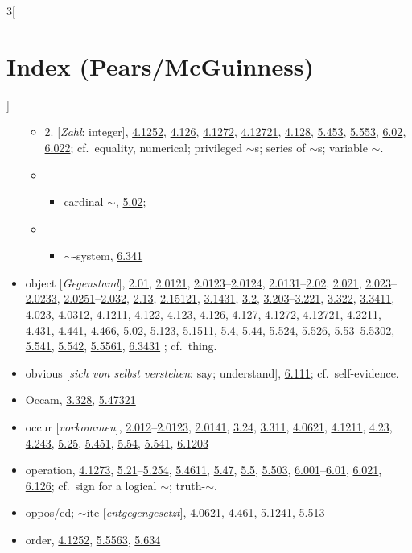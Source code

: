 \documentclass[oneside,openany,12pt]{book}
\newcommand{\indexentry}[1]{\item #1}
\newcommand{\indexsubentry}[1]{\begin{itemize} \item #1 \end{itemize}}
\newcommand{\indexsubsubentry}[1]{\begin{itemize} \item \begin{itemize} \item #1 \end{itemize} \end{itemize}}
\newcommand{\indexref}[1]{\hyperlink{prop#1}{#1}}
\newcommand{\indexgap}{\bigskip}
\begin{document}
\begin{multicols}{3}[\section*{Index (Pears/McGuinness)}]
\begin{itemize}
   \indexsubentry{2. [\textit{Zahl}: integer], \indexref{4.1252}, \indexref{4.126}, \indexref{4.1272}, \indexref{4.12721}, \indexref{4.128}, \indexref{5.453}, \indexref{5.553}, \indexref{6.02}, \indexref{6.022}; cf.\ equality, numerical; privileged $\sim$s; series of $\sim$s; variable $\sim$.}

   \indexsubsubentry{cardinal $\sim$, \indexref{5.02};}

   \indexsubsubentry{$\sim$-system, \indexref{6.341}}

\indexgap

\indexentry{object [\textit{Gegenstand}], \indexref{2.01}, \indexref{2.0121}, \indexref{2.0123}--\indexref{2.0124}, \indexref{2.0131}--\indexref{2.02}, \indexref{2.021}, \indexref{2.023}--\indexref{2.0233}, \indexref{2.0251}--\indexref{2.032}, \indexref{2.13}, \indexref{2.15121}, \indexref{3.1431}, \indexref{3.2}, \indexref{3.203}--\indexref{3.221}, \indexref{3.322}, \indexref{3.3411}, \indexref{4.023}, \indexref{4.0312}, \indexref{4.1211}, \indexref{4.122}, \indexref{4.123}, \indexref{4.126}, \indexref{4.127}, \indexref{4.1272}, \indexref{4.12721}, \indexref{4.2211}, \indexref{4.431}, \indexref{4.441}, \indexref{4.466}, \indexref{5.02}, \indexref{5.123}, \indexref{5.1511}, \indexref{5.4}, \indexref{5.44}, \indexref{5.524}, \indexref{5.526}, \indexref{5.53}--\indexref{5.5302}, \indexref{5.541}, \indexref{5.542}, \indexref{5.5561}, \indexref{6.3431} ; cf.\ thing.}

\indexentry{obvious [\textit{sich von selbst verstehen}: say; understand], \indexref{6.111}; cf.\ self-evidence.}

\indexentry{Occam, \indexref{3.328}, \indexref{5.47321}}

\indexentry{occur [\textit{vorkommen}], \indexref{2.012}--\indexref{2.0123}, \indexref{2.0141}, \indexref{3.24}, \indexref{3.311}, \indexref{4.0621}, \indexref{4.1211}, \indexref{4.23}, \indexref{4.243}, \indexref{5.25}, \indexref{5.451}, \indexref{5.54}, \indexref{5.541}, \indexref{6.1203}}

\indexentry{operation, \indexref{4.1273}, \indexref{5.21}--\indexref{5.254}, \indexref{5.4611}, \indexref{5.47}, \indexref{5.5}, \indexref{5.503}, \indexref{6.001}--\indexref{6.01}, \indexref{6.021}, \indexref{6.126}; cf.\ sign for a logical $\sim$; truth-$\sim$.}

\indexentry{oppos/ed; $\sim$ite [\textit{entgegengesetzt}], \indexref{4.0621}, \indexref{4.461}, \indexref{5.1241}, \indexref{5.513}}

\indexentry{order, \indexref{4.1252}, \indexref{5.5563}, \indexref{5.634}}


\end{itemize}
\end{multicols}
\end{document}
